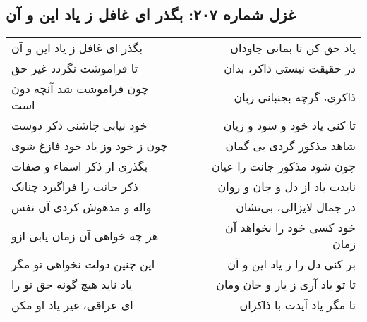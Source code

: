 \begin{center}
\section*{غزل شماره ۲۰۷: بگذر ای غافل ز یاد این و آن}
\label{sec:207}
\begin{longtable}{l p{0.5cm} r}
بگذر ای غافل ز یاد این و آن
&&
یاد حق کن تا بمانی جاودان
\\
تا فراموشت نگردد غیر حق
&&
در حقیقت نیستی ذاکر، بدان
\\
چون فراموشت شد آنچه دون است
&&
ذاکری، گرچه بجنبانی زبان
\\
خود نیابی چاشنی ذکر دوست
&&
تا کنی یاد خود و سود و زیان
\\
چون ز خود وز یاد خود فازغ شوی
&&
شاهد مذکور گردی بی گمان
\\
بگذری از ذکر اسماء و صفات
&&
چون شود مذکور جانت را عیان
\\
ذکر جانت را فراگیرد چنانک
&&
نایدت یاد از دل و جان و روان
\\
واله و مدهوش کردی آن نفس
&&
در جمال لایزالی، بی‌نشان
\\
هر چه خواهی آن زمان یابی ازو
&&
خود کسی خود را نخواهد آن زمان
\\
این چنین دولت نخواهی تو مگر
&&
بر کنی دل را ز یاد این و آن
\\
یاد ناید هیچ گونه حق تو را
&&
تا تو یاد آری ز یار و خان ومان
\\
ای عراقی، غیر یاد او مکن
&&
تا مگر یاد آیدت با ذاکران
\\
\end{longtable}
\end{center}

